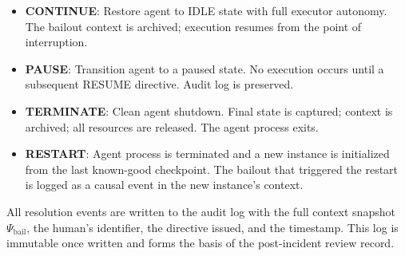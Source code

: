 \begin{itemize}
  \item \textbf{CONTINUE}: Restore agent to IDLE state with full executor autonomy. The bailout context is archived; execution resumes from the point of interruption.
  \item \textbf{PAUSE}: Transition agent to a paused state. No execution occurs until a subsequent RESUME directive. Audit log is preserved.
  \item \textbf{TERMINATE}: Clean agent shutdown. Final state is captured; context is archived; all resources are released. The agent process exits.
  \item \textbf{RESTART}: Agent process is terminated and a new instance is initialized from the last known-good checkpoint. The bailout that triggered the restart is logged as a causal event in the new instance's context.
\end{itemize}

All resolution events are written to the audit log with the full context snapshot $\Psi_{\text{bail}}$, the human's identifier, the directive issued, and the timestamp. This log is immutable once written and forms the basis of the post-incident review record.

